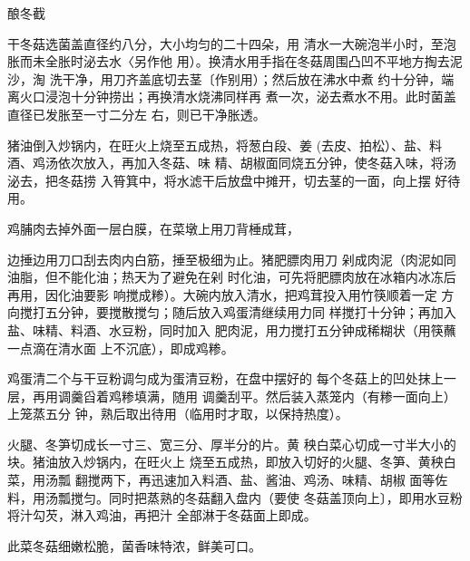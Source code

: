 \begin{recipe}{酿冬截}

\ingredients


\cooking

\step 	干冬菇选菌盖直径约八分，大小均匀的二十四朵，用 清水一大碗泡半小时，至泡胀而未全胀时泌去水〈另作他 用）。换清水用手指在冬菇周围凸凹不平地方掏去泥沙，淘 洗干净，用刀齐盖底切去茎〔作别用）；然后放在沸水中煮 约十分钟，端离火口浸泡十分钟捞出；再换清水烧沸同样再 煮一次，泌去煮水不用。此时菌盖直径已发胀至一寸二分左 右，则已干净胀透。

猪油倒入炒锅内，在旺火上烧至五成热，将葱白段、姜 (去皮、拍松）、盐、料酒、鸡汤依次放入，再加入冬菇、味 精、胡椒面同烧五分钟，使冬菇入味，将汤泌去，把冬菇捞 入筲箕中，将水滤干后放盘中摊开，切去茎的一面，向上摆 好待用。

\step 	鸡脯肉去掉外面一层白膜，在菜墩上用刀背棰成茸，

边捶边用刀口刮去肉内白筋，捶至极细为止。猪肥膘肉用刀 剁成肉泥（肉泥如同油脂，但不能化油；热天为了避免在剁 时化油，可先将肥膘肉放在冰箱内冰冻后再用，因化油要影 响搅成糁）。大碗内放入清水，把鸡茸投入用竹筷顺着一定 方向搅打五分钟，要搅散搅匀；随后放入鸡蛋清继续用力同 样搅打十分钟；再加入盐、味精、料酒、水豆粉，同时加入 肥肉泥，用力搅打五分钟成稀糊状（用筷蘸一点滴在清水面 上不沉底），即成鸡糁。

鸡蛋清二个与干豆粉调匀成为蛋清豆粉，在盘中摆好的 每个冬菇上的凹处抹上一层，再用调羹舀着鸡糁填满，随用 调羹刮平。然后装入蒸笼内（有糁一面向上）上笼蒸五分 钟，熟后取出待用（临用时才取，以保持热度）。

\step 火腿、冬笋切成长一寸三、宽三分、厚半分的片。黄 秧白菜心切成一寸半大小的块。猪油放入炒锅内，在旺火上 烧至五成热，即放入切好的火腿、冬笋、黄秧白菜，用汤瓢 翻搅两下，再迅速加入料酒、盐、酱油、鸡汤、味精、胡椒 面等佐料，用汤瓢搅匀。同时把蒸熟的冬菇翻入盘内（要使 冬菇盖顶向上〕，即用水豆粉将汁勾芡，淋入鸡油，再把汁 全部淋于冬菇面上即成。

\notes

此菜冬菇细嫩松脆，菌香味特浓，鲜美可口。

\end{recipe}

